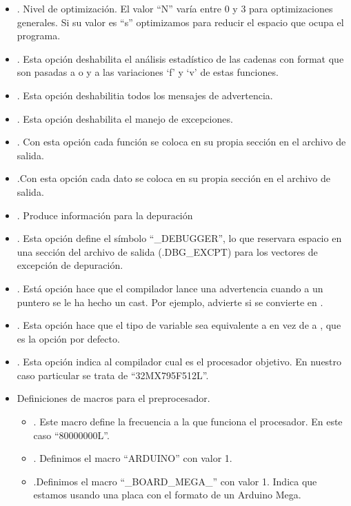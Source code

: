 \begin{itemize}
	\item {}. Nivel de optimización. El valor ``N'' varía entre 0 y 3 para optimizaciones generales. Si su valor es ``s'' optimizamos para reducir el espacio que ocupa el programa.
	\item {}. Esta opción deshabilita el análisis estadístico de las cadenas con format que son pasadas a  o  y a las variaciones `f' y `v' de estas funciones.
	\item {}. Esta opción deshabilitia todos los mensajes de advertencia.
	\item {}. Esta opción deshabilita el manejo de excepciones.
	\item {}. Con esta opción cada función se coloca en su propia sección en el archivo de salida.
	\item {}.Con esta opción cada dato se coloca en su propia sección en el archivo de salida.
	\item {}. Produce información para la depuración
	\item {}. Esta opción define el símbolo ``\_DEBUGGER'', lo que reservara espacio en una sección del archivo de salida (.DBG\_EXCPT) para los vectores de excepción de depuración.
	\item {}. Está opción hace que el compilador lance una advertencia cuando a un puntero se le ha hecho un cast. Por ejemplo, advierte si  se convierte en .
	\item {}. Esta opción hace que el tipo de variable  sea equivalente a  en vez de a , que es la opción por defecto.
	\item {}. Esta opción indica al compilador cual es el procesador objetivo. En nuestro caso particular se trata de ``32MX795F512L''.
	\item Definiciones de macros para el preprocesador.
	\begin{itemize}
		\item {}. Este macro define la frecuencia a la que funciona el procesador. En este caso ``80000000L''.
		\item {}. Definimos el macro ``ARDUINO'' con valor 1.
		\item {}.Definimos el macro ``\_BOARD\_MEGA\_'' con valor 1. Indica que estamos usando una placa con el formato de un Arduino Mega.

\end{itemize}
\end{itemize}
